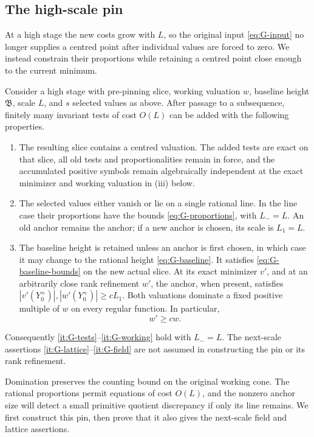 \subsection{The high-scale pin}

At a high stage the new costs grow with $L$, so the original input
\eqref{eq:G-input} no longer supplies a centred point after individual
values are forced to zero.  We instead constrain their proportions while
retaining a centred point close enough to the current minimum.

\begin{proposition}\label{prop:G-high-pin}
Consider a high stage with pre-pinning slice, working valuation $w$,
baseline height $\mathfrak B$, scale $L$, and $s$ selected values as above.
After passage to a subsequence, finitely many invariant tests of cost
$O(L)$ can be added with the following properties.
\begin{enumerate}[label=\textup{(\roman*)}]
\item The resulting slice contains a centred valuation.  The added tests
are exact on that slice, all old tests and proportionalities remain in
force, and the accumulated positive symbols remain algebraically
independent at the exact minimizer and working valuation in
\textup{(iii)} below.
\item The selected values either vanish or lie on a single rational
line.  In the line case their proportions have the bounds
\eqref{eq:G-proportions}, with $L_-=L$.  An old anchor remains the anchor;
if a new anchor is chosen, its scale is $L_1=L$.
\item The baseline height is retained unless an anchor is first chosen,
in which case it may change to the rational height
\eqref{eq:G-baseline}.  It satisfies \eqref{eq:G-baseline-bounds} on the
new actual slice.  At its exact minimizer $v'$, and at an arbitrarily close
rank refinement $w'$, the anchor, when present, satisfies
$|v'(Y_0^+)|,|w'(Y_0^+)|\ge cL_1$.  Both valuations dominate a fixed positive
multiple of $w$ on every regular function.  In particular,
\[
                         w'\ge c w.
\]
\end{enumerate}
Consequently \ref{it:G-tests}--\ref{it:G-working} hold with $L_-=L$.
The next-scale assertions \ref{it:G-lattice}--\ref{it:G-field} are not
assumed in constructing the pin or its rank refinement.
\end{proposition}

Domination preserves the counting bound on the original working cone.
The rational proportions permit equations of cost $O(L)$, and the
nonzero anchor size will detect a small primitive quotient discrepancy
if only its line remains.  We first construct this pin, then prove that
it also gives the next-scale field and lattice assertions.

